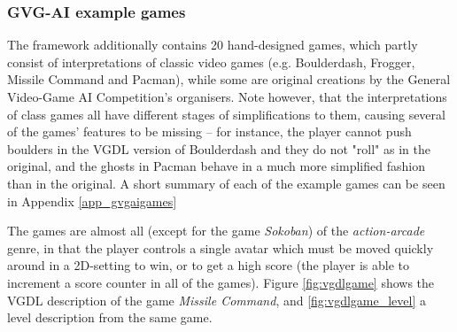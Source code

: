 \documentclass[a4paper,titlepage,final]{report}
\begin{document}
\subsubsection*{GVG-AI example games}
The framework additionally contains 20 hand-designed games, which partly consist of interpretations of classic video games (e.g. Boulderdash, Frogger, Missile Command and Pacman), while some are original creations by the General Video-Game AI Competition's organisers. 
Note however, that the interpretations of class games all have different stages of simplifications to them, causing several of the games' features to be missing -- for instance, the player cannot push boulders in the VGDL version of Boulderdash and they do not "roll" as in the original, and the ghosts in Pacman behave in a much more simplified fashion than in the original.
A short summary of each of the example games can be seen in Appendix \ref{app_gvgaigames}

The games are almost all (except for the game \emph{Sokoban}) of the \textit{action-arcade} genre, in that the player controls a single avatar which must be moved quickly around in a 2D-setting to win, or to get a high score (the player is able to increment a score  counter in all of the games).
Figure \ref{fig:vgdlgame} shows the VGDL description of the game \emph{Missile Command}, and \ref{fig:vgdlgame_level} a level description from the same game.
\end{document}
